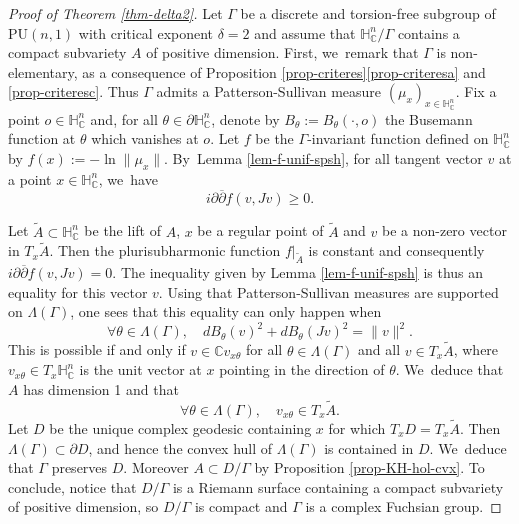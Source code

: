 \documentclass[11pt]{article}
\theoremstyle{definition}
\newcommand{\C}{\mathbb{C}}
\newcommand{\HNC}{\mathbb{H}^{n}_{\C}}
\newcommand{\PHNC}{\partial\mathbb{H}^{n}_{\C}}
\newcommand{\PU}{\mathrm{PU}}
\def\C{\mathbb{C}}
\newcommand{\HNC}{\mathbb{H}^{n}_{\C}}
\newcommand{\PU}{\mathrm{PU}}
\begin{document}
\begin{proof}[Proof of Theorem \ref{thm-delta2}]
Let $\Gamma$ be a discrete and torsion-free subgroup of $\PU(n,1)$ with critical exponent $\delta=2$ and assume that $\HNC/\Gamma$ contains a compact subvariety $A$ of positive dimension.
First, we~remark that $\Gamma$ is non-elementary, as a consequence of Proposition \ref{prop-criteres}\eqref{prop-criteresa} and \eqref{prop-criteresc}. Thus $\Gamma$ admits a Patterson-Sullivan measure $(\mu_x)_{x\in \HNC}$. Fix a point $o\in \HNC$ and, for all $\theta\in \PHNC$, denote by $B_\theta:=B_{\theta}(\cdot,o)$ the Busemann function at $\theta$ which vanishes at $o$. Let ${f}$ be the $\Gamma$\nobreakdash-invariant function defined on $\HNC$ by $f(x):=-\ln \lVert \mu_x\rVert$. By~Lemma \ref{lem-f-unif-spsh}, for all tangent vector $v$ at a point $x\in \HNC$, we~have
\begin{equation*}
i\partial\overline{\partial}{f}(v,Jv) \ge 0.
\end{equation*}

Let $\widetilde{A}\subset \HNC$ be the lift of $A$, $x$ be a regular point of $\widetilde{A}$ and $v$ be a non-zero vector in $T_x\widetilde{A}$. Then the plurisubharmonic function ${f}\vert_{ \widetilde{A}}$ is constant and consequently $i\partial\overline{\partial}{f}(v,Jv) = 0$.
The inequality given by Lemma \ref{lem-f-unif-spsh} is thus an equality for this vector $v$. Using that Patterson-Sullivan measures are supported on $\Lambda(\Gamma)$, one sees that this equality can only happen when
\begin{equation*}
\forall \theta\in \Lambda(\Gamma),\quad dB_{\theta}(v)^{2}+dB_{\theta}(Jv)^{2} = \lVert v\rVert^{2}.
\end{equation*}
This is possible if and only if $v\in \C v_{x\theta}$ for all $\theta\in \Lambda(\Gamma)$ and all $v\in T_x\widetilde{A}$, where $v_{x\theta} \in T_x\HNC$ is the unit vector at $x$ pointing in the direction of $\theta$. We~deduce that $A$ has dimension 1 and that
\begin{equation*}
\forall \theta\in \Lambda(\Gamma),\quad v_{x\theta}\in T_x\widetilde{A}.
\end{equation*}
Let $D$ be the unique complex geodesic containing $x$ for which $T_xD=T_x\widetilde{A}$. Then $\Lambda(\Gamma)\subset \partial D$, and hence the convex hull of $\Lambda(\Gamma)$ is contained in $D$. We~deduce that $\Gamma$ preserves $D$. Moreover $A\subset D/\Gamma$ by Proposition \ref{prop-KH-hol-cvx}. To conclude, notice that $D/\Gamma$ is a Riemann surface containing a compact subvariety of positive dimension, so $D/\Gamma$ is compact and $\Gamma$ is a complex Fuchsian group.
\end{proof}
\end{document}
